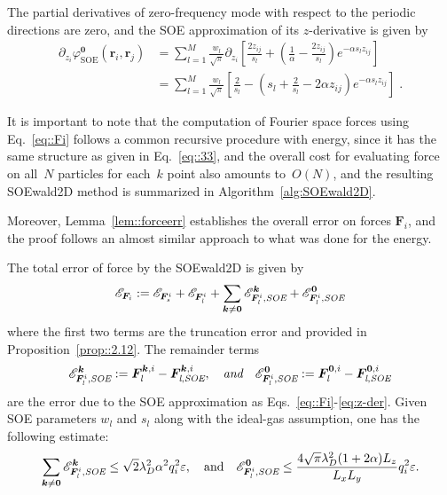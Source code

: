 The partial derivatives of zero-frequency mode with respect to the periodic directions are zero, and the SOE approximation of its $z$-derivative is given by
\begin{equation}\label{eq:dzphi_0}
	\begin{split}
		\partial_{z_{i}} \varphi^{\bm{0}}_{\text{SOE}}(\bm{r}_{i},\bm{r}_{j}) 
		& = \sum_{l=1}^{M} \frac{w_l}{\sqrt{\pi}} \partial_{z_{i}} \left[\frac{2z_{ij}}{s_l}+\left(\frac{1}{\alpha} - \frac{2z_{ij}}{s_l}\right)e^{-\alpha s_l z_{ij}}\right] \\
		& = \sum_{l=1}^{M} \frac{w_l}{\sqrt{\pi}} \left[ \frac{2}{s_l} - \left( s_l + \frac{2}{s_l} - 2 \alpha z_{ij} \right) e^{-\alpha s_l z_{ij}} \right]\;.
	\end{split}
\end{equation}

It is important to note that the computation of Fourier space forces using Eq.~\eqref{eq::Fi} follows a common recursive procedure with energy, since it has the same structure as given in Eq.~\eqref{eq::33}, and the overall cost for evaluating force on all~$N$ particles for each~$k$ point also amounts to~$O(N)$, and the resulting SOEwald2D method is summarized in Algorithm~\ref{alg:SOEwald2D}.

Moreover, Lemma~\ref{lem::forceerr} establishes the overall error on forces $\bm{F}_{i}$, and the proof follows an almost similar approach to what was done for the energy. %

\begin{lem}\label{lem::forceerr}
	The total error of force by the SOEwald2D is given by
	\begin{equation}
		\mathscr{E}_{\bm{F}_{i}} := \mathscr{E}_{\bm{F}_{\emph{s}}^{i}} + \mathscr{E}_{\bm{F}_{\emph{l}}^{i}} + \sum_{\bm{k}\neq \bm{0}} \mathscr{E}_{\bm{F}_{\emph{l}}^i, \emph{SOE}}^{\bm{k}} + \mathscr{E}_{\bm{F}_{\emph{l}}^{i},\emph{SOE}}^{\bm{0}}
	\end{equation}
	where the first two terms are the truncation error and provided in Proposition~\ref{prop::2.12}. The remainder terms 
	\begin{equation}
		\mathscr{E}_{\bm{F}_{\emph{l}}^i,\emph{SOE}}^{\bm{k}} := \bm{F}_{\emph{l}}^{\bm{k}, i} - \bm{F}_{\emph{l},\emph{SOE}}^{\bm{k}, i}, \quad\emph{and} \quad \mathscr{E}_{\bm{F}_{\emph{l}}^{i}, \emph{SOE}}^{\bm{0}} := \bm{F}_{\emph{l}}^{\bm{0}, i}-\bm{F}_{\emph{l}, \emph{SOE}}^{\bm{0}, i}
	\end{equation}
	are the error due to the SOE approximation as Eqs.~\eqref{eq::Fi}-\eqref{eq:z-der}. Given SOE parameters $w_l$ and $s_l$ along with the ideal-gas assumption, one has the following estimate:
	\begin{equation}
		\sum_{\bm{k}\neq\bm{0}} \mathscr{E}_{\bm{F}_{\emph{l}}^i, \emph{SOE}}^{ \bm{k}}\leq \sqrt{2}\lambda_D^2\alpha^2q_{i}^2\varepsilon,\quad\text{and}\quad \mathscr{E}_{\bm{F}_{\emph{l}}^{i},\emph{SOE}}^{\bm{0}}\leq \frac{4\sqrt{\pi}\lambda_D^2 (1+2\alpha)L_z}{L_xL_y}q_{i}^2\varepsilon.
	\end{equation}
\end{lem}

